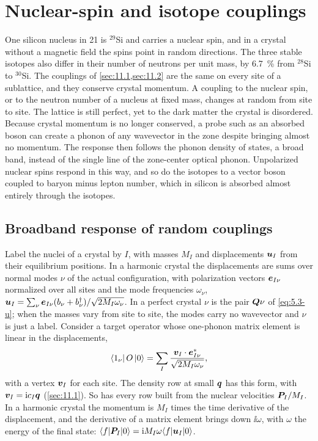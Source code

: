 \section{Nuclear-spin and isotope couplings}\label{sec:11.6}

One silicon nucleus in 21 is $^{29}$Si and carries a nuclear spin, and in a crystal without a magnetic field the spins point in random directions. The three stable isotopes also differ in their number of neutrons per unit mass, by \SI{6.7}{\percent} from $^{28}$Si to $^{30}$Si. The couplings of \cref{sec:11.1,sec:11.2} are the same on every site of a sublattice, and they conserve crystal momentum. A coupling to the nuclear spin, or to the neutron number of a nucleus at fixed mass, changes at random from site to site. The lattice is still perfect, yet to the dark matter the crystal is disordered. Because crystal momentum is no longer conserved, a probe such as an absorbed boson can create a phonon of any wavevector in the zone despite bringing almost no momentum. The response then follows the phonon density of states, a broad band, instead of the single line of the zone-center optical phonon. Unpolarized nuclear spins respond in this way, and so do the isotopes to a vector boson coupled to baryon minus lepton number, which in silicon is absorbed almost entirely through the isotopes.

\subsection{Broadband response of random couplings}\label{sec:11.6-random}

Label the nuclei of a crystal by $I$, with masses $M_I$ and displacements $\bm{u}_I$ from their equilibrium positions. In a harmonic crystal the displacements are sums over normal modes $\nu$ of the actual configuration, with polarization vectors $\bm{e}_{I\nu}$ normalized over all sites and the mode frequencies $\omega_\nu$, $\bm{u}_I = \sum_\nu\bm{e}_{I\nu}(b_\nu + b_\nu^\dagger)/\sqrt{2M_I\omega_\nu}$. In a perfect crystal $\nu$ is the pair $\bm{Q}\nu$ of \cref{eq:5.3-u}; when the masses vary from site to site, the modes carry no wavevector and $\nu$ is just a label. Consider a target operator whose one-phonon matrix element is linear in the displacements,
\begin{equation*}
  \langle 1_\nu|\,O\,|0\rangle = \sum_I\frac{\bm{v}_I\cdot\bm{e}_{I\nu}^*}{\sqrt{2M_I\omega_\nu}} ,
\end{equation*}
with a vertex $\bm{v}_I$ for each site. The density row at small $\bm{q}$ has this form, with $\bm{v}_I = \mathrm{i} c_I\bm{q}$ (\cref{sec:11.1}). So has every row built from the nuclear velocities $\bm{P}_I/M_I$. In a harmonic crystal the momentum is $M_I$ times the time derivative of the displacement, and the derivative of a matrix element brings down $\ii\omega$, with $\omega$ the energy of the final state: $\langle f|\bm{P}_I|0\rangle = \mathrm{i} M_I\omega\langle f|\bm{u}_I|0\rangle$.

